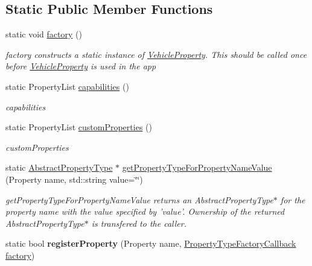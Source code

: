 \subsection*{Static Public Member Functions}
\begin{DoxyCompactItemize}
\item 
\hypertarget{classVehicleProperty_a528c8e2ee75036f6e50c0121f4184fa2}{static void \hyperlink{classVehicleProperty_a528c8e2ee75036f6e50c0121f4184fa2}{factory} ()}\label{classVehicleProperty_a528c8e2ee75036f6e50c0121f4184fa2}

\begin{DoxyCompactList}\small\item\em factory constructs a static instance of \hyperlink{classVehicleProperty}{Vehicle\+Property}. This should be called once before \hyperlink{classVehicleProperty}{Vehicle\+Property} is used in the app \end{DoxyCompactList}\item 
static Property\+List \hyperlink{classVehicleProperty_a3a98f69c977cad98a31f4dfc998d8668}{capabilities} ()
\begin{DoxyCompactList}\small\item\em capabilities \end{DoxyCompactList}\item 
static Property\+List \hyperlink{classVehicleProperty_a5b4e3efd4a48d34e0c9a6eef2bfcbfdc}{custom\+Properties} ()
\begin{DoxyCompactList}\small\item\em custom\+Properties \end{DoxyCompactList}\item 
\hypertarget{classVehicleProperty_a60e654875a0d5901af8ab2d3dc596472}{static \hyperlink{classAbstractPropertyType}{Abstract\+Property\+Type} $\ast$ \hyperlink{classVehicleProperty_a60e654875a0d5901af8ab2d3dc596472}{get\+Property\+Type\+For\+Property\+Name\+Value} (Property name, std\+::string value=\char`\"{}\char`\"{})}\label{classVehicleProperty_a60e654875a0d5901af8ab2d3dc596472}

\begin{DoxyCompactList}\small\item\em get\+Property\+Type\+For\+Property\+Name\+Value returns an Abstract\+Property\+Type$\ast$ for the property name with the value specified by 'value'. Ownership of the returned Abstract\+Property\+Type$\ast$ is transfered to the caller. \end{DoxyCompactList}\item 
\hypertarget{classVehicleProperty_aec55cb2758688c0e92dc53f67b320208}{static bool {\bfseries register\+Property} (Property name, \hyperlink{classVehicleProperty_a6fdd075ce5b867b571020fcdc723ddcf}{Property\+Type\+Factory\+Callback} \hyperlink{classVehicleProperty_a528c8e2ee75036f6e50c0121f4184fa2}{factory})}\label{classVehicleProperty_aec55cb2758688c0e92dc53f67b320208}

\end{DoxyCompactItemize}
